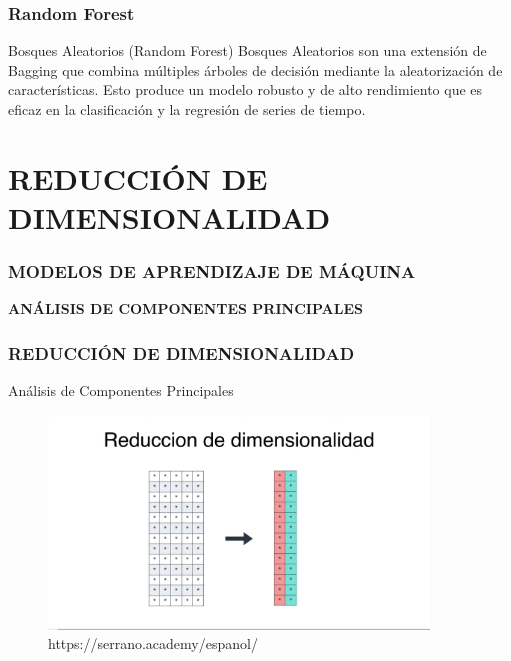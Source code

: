 \documentclass{beamer}
\begin{document}
\begin{frame}

  \frametitle{Random Forest}
  \begin{block}{Bosques Aleatorios (Random Forest)}
        Bosques Aleatorios son una extensión de Bagging que combina múltiples árboles de decisión mediante la aleatorización de características. Esto produce un modelo robusto y de alto rendimiento que es eficaz en la clasificación y la regresión de series de tiempo.
  \end{block}

\end{frame}


\section{REDUCCIÓN DE DIMENSIONALIDAD}

\begin{frame}
	\frametitle{MODELOS DE APRENDIZAJE DE MÁQUINA}
	\begin{block}{}	
		\center
		\textbf{ANÁLISIS DE COMPONENTES PRINCIPALES}
	\end{block}
\end{frame}

\begin{frame}
	\frametitle{REDUCCIÓN DE DIMENSIONALIDAD}
	\begin{block}{Análisis de Componentes Principales}	
		\begin{figure}
			\includegraphics[width=0.9\textwidth]{PCA/IMG_3525.jpg}
			\caption{https://serrano.academy/espanol/}
		\end{figure}
	\end{block}
\end{frame}
\end{document}
